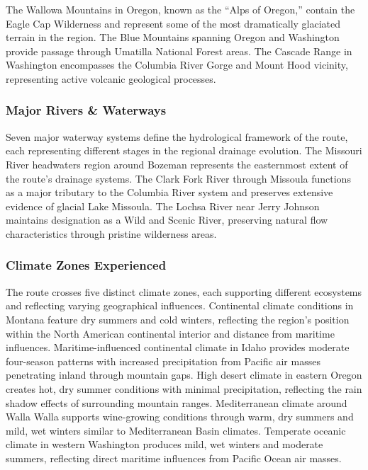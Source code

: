 \documentclass[
  11pt,
  letterpaper,
  DIV=10,
  numbers=noendperiod]{scrartcl}
\begin{document}
The Wallowa Mountains in Oregon, known as the ``Alps of Oregon,''
contain the Eagle Cap Wilderness and represent some of the most
dramatically glaciated terrain in the region. The Blue Mountains
spanning Oregon and Washington provide passage through Umatilla National
Forest areas. The Cascade Range in Washington encompasses the Columbia
River Gorge and Mount Hood vicinity, representing active volcanic
geological processes.

\subsubsection{Major Rivers \& Waterways}\label{major-rivers-waterways}

Seven major waterway systems define the hydrological framework of the
route, each representing different stages in the regional drainage
evolution. The Missouri River headwaters region around Bozeman
represents the easternmost extent of the route's drainage systems. The
Clark Fork River through Missoula functions as a major tributary to the
Columbia River system and preserves extensive evidence of glacial Lake
Missoula. The Lochsa River near Jerry Johnson maintains designation as a
Wild and Scenic River, preserving natural flow characteristics through
pristine wilderness areas.

\subsubsection{Climate Zones
Experienced}\label{climate-zones-experienced}

The route crosses five distinct climate zones, each supporting different
ecosystems and reflecting varying geographical influences. Continental
climate conditions in Montana feature dry summers and cold winters,
reflecting the region's position within the North American continental
interior and distance from maritime influences. Maritime-influenced
continental climate in Idaho provides moderate four-season patterns with
increased precipitation from Pacific air masses penetrating inland
through mountain gaps. High desert climate in eastern Oregon creates
hot, dry summer conditions with minimal precipitation, reflecting the
rain shadow effects of surrounding mountain ranges. Mediterranean
climate around Walla Walla supports wine-growing conditions through
warm, dry summers and mild, wet winters similar to Mediterranean Basin
climates. Temperate oceanic climate in western Washington produces mild,
wet winters and moderate summers, reflecting direct maritime influences
from Pacific Ocean air masses.
\end{document}
